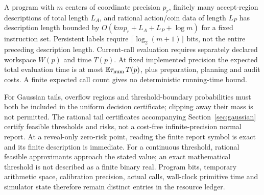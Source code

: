 A program with $m$ centers of coordinate precision $p_r$, finitely many accept-region descriptions of total length $L_A$, and rational action/coin data of length $L_P$ has description length bounded by
$O(kmp_r+L_A+L_P+\log m)$ for a fixed instruction set. Persistent labels require $\lceil\log_2(m+1)\rceil$ bits, not the entire preceding description length. Current-call evaluation requires separately declared workspace $W(p)$ and time $T(p)$. At fixed implemented precision the expected total evaluation time is at most $\mathbb E\tau_{\rm num}\,T(p)$, plus preparation, planning and audit costs. A finite expected call count gives no deterministic running-time bound.

For Gaussian tails, overflow regions and threshold-boundary probabilities must both be included in the uniform decision certificate; clipping away their mass is not permitted. The rational tail certificates accompanying Section~\ref{sec:gaussian} certify feasible thresholds and risks, not a cost-free infinite-precision normal report. At a reveal-only zero-risk point, reading the finite report symbol is exact and its finite description is immediate. For a continuous threshold, rational feasible approximants approach the stated value; an exact mathematical threshold is not described as a finite binary real. Program bits, temporary arithmetic space, calibration precision, actual calls, wall-clock primitive time and simulator state therefore remain distinct entries in the resource ledger.
